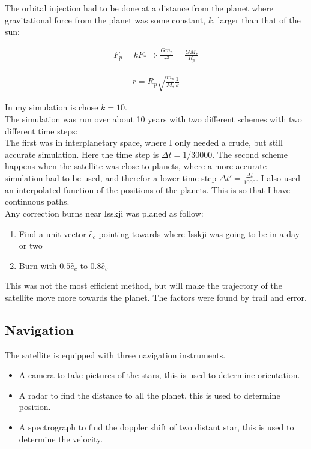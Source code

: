 \documentclass[a4paper, 10pt]{article}
\begin{document}
The orbital injection had to be done at a distance from the planet where gravitational force from the planet was some constant, $k$, larger than that of the sun:

\begin{align}
F_p = kF_* \Rightarrow \frac{Gm_p}{r^2} = \frac{GM_*}{R_p}
\end{align}


\begin{align}\label{eq:safeDist}
r = R_p\sqrt{\frac{m_p}{M_*}\frac{1}{k}}
\end{align}

In my simulation is chose $k = 10$. \\

The simulation was run over about 10 years with two different schemes with two different time steps:\\
The first was in interplanetary space, where I only needed a crude, but still accurate simulation. Here the time step is $\Delta t = 1/30000$. The second scheme happens when the satellite was close to planets, where a more accurate simulation had to be used, and therefor a lower time step $\Delta t' =\frac{\Delta t}{1000}$. I also used an interpolated function of the positions of the planets. This is so that I have continuous paths.\\

Any correction burns near Isskji was planed as follow:

\begin{enumerate}
\item Find a unit vector $\hat{e}_{c}$ pointing towards where Isskji was going to be in a day or two
\item Burn with $0.5\hat{e}_{c} $ to $ 0.8\hat{e}_{c}$
\end{enumerate}

This was not the most efficient method, but will make the trajectory of the satellite move more towards the planet. The factors were found by trail and error. 


\subsection{Navigation}
The satellite is equipped with three navigation instruments.

\begin{itemize}
\item A camera to take pictures of the stars, this is used to determine orientation.
\item A radar to find the distance to all the planet, this is used to determine position.
\item A spectrograph to find the doppler shift of two distant star, this is used to determine the velocity. 
\end{itemize}
\end{document}
